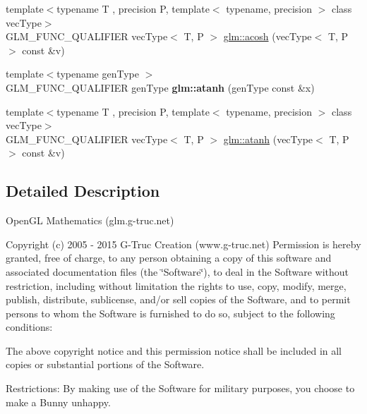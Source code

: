 \begin{DoxyCompactItemize}
\item 
{\footnotesize template$<$typename T , precision P, template$<$ typename, precision $>$ class vec\-Type$>$ }\\G\-L\-M\-\_\-\-F\-U\-N\-C\-\_\-\-Q\-U\-A\-L\-I\-F\-I\-E\-R vec\-Type$<$ T, P $>$ \hyperlink{group__core__func__trigonometric_ga3f368ad3e1883b60748ca2634d816104}{glm\-::acosh} (vec\-Type$<$ T, P $>$ const \&v)
\item 
\hypertarget{namespaceglm_a8e94362a2750aaf44e4aea98e42c8817}{{\footnotesize template$<$typename gen\-Type $>$ }\\G\-L\-M\-\_\-\-F\-U\-N\-C\-\_\-\-Q\-U\-A\-L\-I\-F\-I\-E\-R gen\-Type {\bfseries glm\-::atanh} (gen\-Type const \&x)}\label{namespaceglm_a8e94362a2750aaf44e4aea98e42c8817}

\item 
{\footnotesize template$<$typename T , precision P, template$<$ typename, precision $>$ class vec\-Type$>$ }\\G\-L\-M\-\_\-\-F\-U\-N\-C\-\_\-\-Q\-U\-A\-L\-I\-F\-I\-E\-R vec\-Type$<$ T, P $>$ \hyperlink{group__core__func__trigonometric_gaffa8decdd8620759f4e6fe4834768b87}{glm\-::atanh} (vec\-Type$<$ T, P $>$ const \&v)
\end{DoxyCompactItemize}


\subsection{Detailed Description}
Open\-G\-L Mathematics (glm.\-g-\/truc.\-net)

Copyright (c) 2005 -\/ 2015 G-\/\-Truc Creation (www.\-g-\/truc.\-net) Permission is hereby granted, free of charge, to any person obtaining a copy of this software and associated documentation files (the \char`\"{}\-Software\char`\"{}), to deal in the Software without restriction, including without limitation the rights to use, copy, modify, merge, publish, distribute, sublicense, and/or sell copies of the Software, and to permit persons to whom the Software is furnished to do so, subject to the following conditions\-:

The above copyright notice and this permission notice shall be included in all copies or substantial portions of the Software.

Restrictions\-: By making use of the Software for military purposes, you choose to make a Bunny unhappy.

